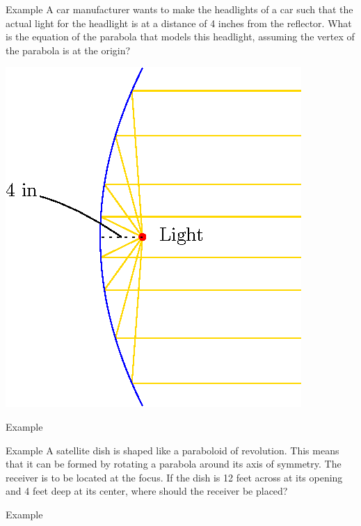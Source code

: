 \documentclass[presentation]{beamer}
\begin{document}
\begin{frame}[label={sec:orgb3329d8}]{Example}
A car manufacturer wants to make the headlights of a car such that the
actual light for the headlight is at a distance of 4 inches from the
reflector.  What is the equation of the parabola that models this
headlight, assuming the vertex of the parabola is at the origin?

\includegraphics{./carlight}
\vspace{10in}
\end{frame}

\begin{frame}[label={sec:orgfa745e0}]{Example}
\end{frame}

\begin{frame}[label={sec:orgadf6ffa}]{Example}
A satellite dish is shaped like a paraboloid of revolution. This means
that it can be formed by rotating a parabola around its axis of
symmetry. The receiver is to be located at the focus. If the dish is
12 feet across at its opening and 4 feet deep at its center, where
should the receiver be placed?

\vspace{10in}
\end{frame}

\begin{frame}[label={sec:org1eace95}]{Example}
\end{frame}
\end{document}
